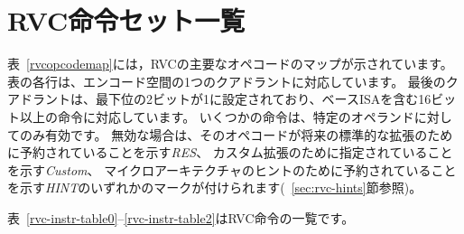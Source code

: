 \clearpage

\begin{comment}
\section{RVC Instruction Set Listings}
\end{comment}
\section{RVC命令セット一覧}

\begin{comment}
Table~\ref{rvcopcodemap} shows a map of the major opcodes for RVC.
Each row of the table corresponds to one quadrant of the encoding
space.  The last quadrant, which has the two
least-significant bits set, corresponds to instructions wider
than 16 bits, including those in the base ISAs.  Several instructions
are only valid for certain operands; when invalid, they are marked
either {\em RES} to indicate that the opcode is reserved for future
standard extensions; {\em Custom} to indicate that the opcode is designated
for custom extensions; or {\em HINT} to indicate that the opcode
is reserved for microarchitectural hints (see Section~\ref{sec:rvc-hints}).
\end{comment}
表~\ref{rvcopcodemap}には，RVCの主要なオペコードのマップが示されています。
表の各行は、エンコード空間の1つのクアドラントに対応しています。
最後のクアドラントは、最下位の2ビットが1に設定されており、ベースISAを含む16ビット以上の命令に対応しています。
いくつかの命令は、特定のオペランドに対してのみ有効です。
無効な場合は、そのオペコードが将来の標準的な拡張のために予約されていることを示す{\em RES}、
カスタム拡張のために指定されていることを示す{\em Custom}、
マイクロアーキテクチャのヒントのために予約されていることを示す{\em HINT}のいずれかのマークが付けられます(~\ref{sec:rvc-hints}節参照)。



\begin{comment}
Tables~\ref{rvc-instr-table0}--\ref{rvc-instr-table2} list the RVC instructions.
\end{comment}
表~\ref{rvc-instr-table0}--\ref{rvc-instr-table2}はRVC命令の一覧です。


